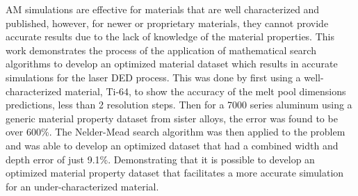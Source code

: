 \label{abstract}

\Acf{AM} simulations are effective for materials that are well characterized and published, however, for newer or proprietary materials, they cannot provide accurate results due to the lack of knowledge of the material properties.  
This work demonstrates the process of the application of mathematical search algorithms to develop an optimized material dataset which results in accurate simulations for the laser \ac{DED} process.  
This was done by first using a well-characterized material, Ti-64, to show the accuracy of the melt pool dimensions predictions, less than 2 resolution steps.  Then for a 7000 series aluminum using a generic material property dataset from sister alloys, the error was found to be over 600\%.
The Nelder-Mead search algorithm was then applied to the problem and was able to develop an optimized dataset that had a combined width and depth error of just 9.1\%.  
Demonstrating that it is possible to develop an optimized material property dataset that facilitates a more accurate simulation for an under-characterized material.